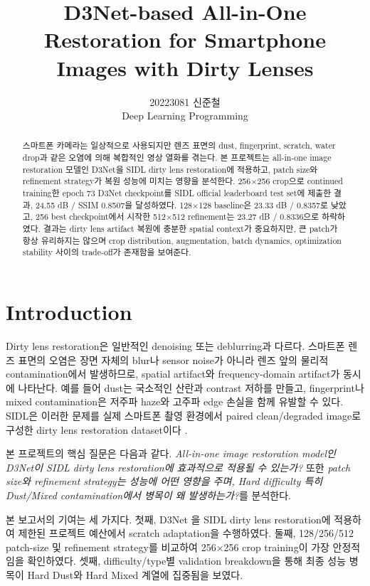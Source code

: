 \documentclass[10pt,a4paper]{article}
\title{\vspace{-1.7em}\textbf{D3Net-based All-in-One Restoration for Smartphone Images with Dirty Lenses}}
\author{20223081 신준철 \\ Deep Learning Programming}
\date{}
\begin{document}
\maketitle
\vspace{-1.4em}

\begin{abstract}
스마트폰 카메라는 일상적으로 사용되지만 렌즈 표면의 dust, fingerprint, scratch, water drop과 같은 오염에 의해 복합적인 영상 열화를 겪는다.
본 프로젝트는 all-in-one image restoration 모델인 D3Net을 SIDL dirty lens restoration에 적용하고, patch size와 refinement strategy가 복원 성능에 미치는 영향을 분석한다.
256$\times$256 crop으로 continued training한 epoch 73 D3Net checkpoint를 SIDL official leaderboard test set에 제출한 결과, 24.55 dB / SSIM 0.8507을 달성하였다.
128$\times$128 baseline은 23.33 dB / 0.8357로 낮았고, 256 best checkpoint에서 시작한 512$\times$512 refinement는 23.27 dB / 0.8336으로 하락하였다.
결과는 dirty lens artifact 복원에 충분한 spatial context가 중요하지만, 큰 patch가 항상 유리하지는 않으며 crop distribution, augmentation, batch dynamics, optimization stability 사이의 trade-off가 존재함을 보여준다.
\end{abstract}

\section{Introduction}
Dirty lens restoration은 일반적인 denoising 또는 deblurring과 다르다.
스마트폰 렌즈 표면의 오염은 장면 자체의 blur나 sensor noise가 아니라 렌즈 앞의 물리적 contamination에서 발생하므로, spatial artifact와 frequency-domain artifact가 동시에 나타난다.
예를 들어 dust는 국소적인 산란과 contrast 저하를 만들고, fingerprint나 mixed contamination은 저주파 haze와 고주파 edge 손실을 함께 유발할 수 있다.
SIDL은 이러한 문제를 실제 스마트폰 촬영 환경에서 paired clean/degraded image로 구성한 dirty lens restoration dataset이다 \cite{choi2025sidl}.

본 프로젝트의 핵심 질문은 다음과 같다.
\textit{All-in-one image restoration model인 D3Net이 SIDL dirty lens restoration에 효과적으로 적용될 수 있는가?}
또한 \textit{patch size와 refinement strategy는 성능에 어떤 영향을 주며, Hard difficulty 특히 Dust/Mixed contamination에서 병목이 왜 발생하는가?}를 분석한다.

본 보고서의 기여는 세 가지다.
첫째, D3Net \cite{wang2025d3net}을 SIDL dirty lens restoration에 적용하여 제한된 프로젝트 예산에서 scratch adaptation을 수행하였다.
둘째, 128/256/512 patch-size 및 refinement strategy를 비교하여 256$\times$256 crop training이 가장 안정적임을 확인하였다.
셋째, difficulty/type별 validation breakdown을 통해 최종 성능 병목이 Hard Dust와 Hard Mixed 계열에 집중됨을 보였다.
\end{document}
